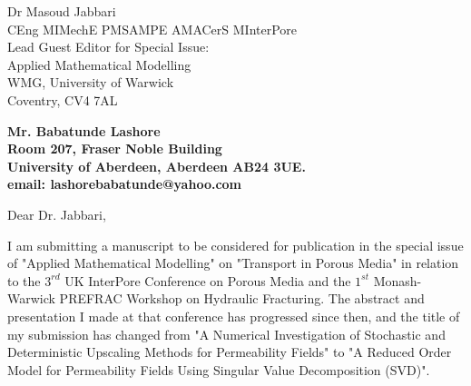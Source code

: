 \documentclass[11pt]{letter} %
\begin{document}

\begin{letter}{Dr Masoud Jabbari \\
CEng MIMechE PMSAMPE AMACerS MInterPore \\
Lead Guest Editor for Special Issue: \\
Applied Mathematical Modelling \\
WMG, University of Warwick \\
Coventry, CV4 7AL}





\begin{center}
\large\bf Mr. Babatunde Lashore \\ %
Room 207, Fraser Noble Building \\ University of Aberdeen, Aberdeen AB24 3UE. \\ email: lashorebabatunde@yahoo.com %
\end{center} 
\vfill

\signature{B. Lashore} %


\opening{Dear Dr. Jabbari,} 
 
I am submitting a manuscript to be considered for publication in the special issue of "Applied Mathematical Modelling" on "Transport in Porous Media" in relation to the $3^{rd}$ UK InterPore Conference on Porous Media and the $1^{st}$ Monash-Warwick PREFRAC Workshop on Hydraulic Fracturing. The abstract and presentation I made at that conference has progressed since then, and the title of my submission has changed from "A Numerical Investigation of Stochastic and Deterministic Upscaling Methods for Permeability Fields" to "A Reduced Order Model for Permeability Fields Using Singular Value Decomposition (SVD)".
 


\end{letter}
\end{document}
